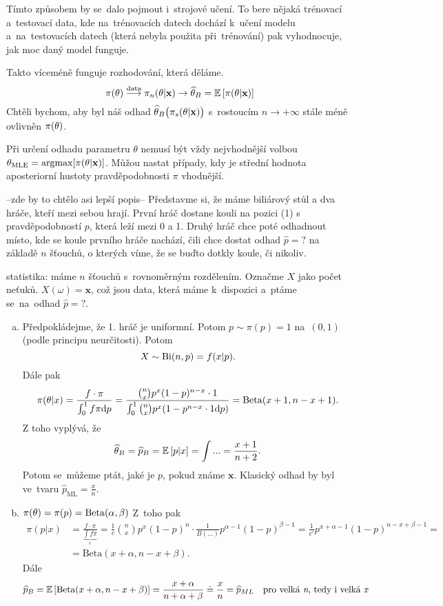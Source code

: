 

\begin{remark}
	Tímto způsobem by se~dalo pojmout i~strojové učení. To bere nějaká trénovací a~testovací data, kde na~trénovacích datech dochází k~učení modelu a~na~testovacích datech (která nebyla použita při~trénování) pak vyhodnocuje, jak moc daný model funguje.
\end{remark}
Takto víceméně funguje rozhodování, která děláme. 
$$ \pi(\theta)\stackrel{\text{data}}{\longrightarrow}\pi_n(\theta|\textbf{x})\to \widehat{\theta}_B=\mathbb{E}\left[ \pi(\theta|\textbf{x}) \right]$$
Chtěli bychom, aby byl náš odhad $\widehat{\theta}_B\big( \pi_s(\theta|\textbf{x}) \big)$ s~rostoucím $n\to+\infty$ stále méně ovlivněn $\pi(\theta)$.
\begin{remark}
Při určení odhadu parametru $ \theta $ nemusí být vždy nejvhodnější volbou $ \theta_{\text{MLE}} = \text{argmax}[\pi(\theta|\textbf{x})]$. Můžou nastat případy, kdy je střední hodnota aposteriorní hustoty pravděpodobnosti $ \pi $ vhodnější.

\end{remark}


\begin{example} --zde by to chtělo asi lepší popis--
	Představme si, že máme biliárový stůl a dva hráče, kteří mezi sebou hrají. První hráč dostane kouli na pozici (1) s pravděpodobností $p$, která leží mezi 0 a 1. Druhý hráč chce poté odhadnout místo, kde se koule prvního hráče nachází, čili chce dostat odhad $\widehat{p}=?$ na základě $n$ šťouchů, o kterých víme, že se buďto dotkly koule, či nikoliv. 
	
	statistika: máme $n$ šťouchů s~rovnoměrným rozdělením. Označme $X$ jako počet neťuků. $X(\omega)=\textbf{x}$, což jsou data, která máme k~dispozici a~ptáme se~na~odhad $\widehat{p}=?$.
	
	
	
	\begin{enumerate}[a)]
		\item Předpokládejme, že 1. hráč je uniformní. Potom $p\sim\pi(p)=1$ na~$(0,1)$ (podle principu neurčitosti). Potom
		$$ X\sim\mathrm{Bi}(n,p)=f(x|p).$$
		Dále pak 
		$$ \pi(\theta|x)=\frac{f\cdot\pi}{\int_0^1 f\pi\mathrm{d} p}=\frac{\binom{n}{x}p^x(1-p)^{n-x}\cdot 1}{\int_0^1 \binom{n}{x}p^x(1-p^{n-x}\cdot1 \mathrm{d} p)}=\mathrm{Beta}(x+1,n-x+1).$$
		Z toho vyplývá, že
		$$ \widehat{\theta}_B=\widehat{p}_B=\mathbb{E}\left[ p|x \right]=\int...=\frac{x+1}{n+2}.$$
		Potom se~můžeme ptát, jaké je $p$, pokud známe $\textbf{x}$. Klasický odhad by byl ve~tvaru $\widehat{p}_{\mathrm{ML}}=\frac{x}{n}$.
		\item $\pi(\theta)=\pi(p)=\mathrm{Beta}(\alpha,\beta)$ Z~toho pak 
		\[
		\begin{split}
		\pi(p|x)&=\frac{f\cdot\pi}{\underbrace{\int f\pi}_c}=\frac{1}{c}\binom{n}{x}p^x(1-p)^n\cdot \frac{1}{B(...)}p^{\alpha-1}(1-p)^{\beta-1}=\frac{1}{c'}p^{x+\alpha-1}(1-p)^{n-x+\beta-1}=\\&=\mathrm{Beta}(x+\alpha,n-x+\beta).
		\end{split}
		\] 
		Dále
		$$ \widehat{p}_B=\mathbb{E}\left[ \mathrm{Beta}(x+\alpha,n-x+\beta) \right]=\frac{x+\alpha}{n+\alpha+\beta}\doteq\frac{x}{n} = \widehat{p}_{ML} ~~~\text{pro velká \textit{n}, tedy i velká \textit{x}}$$
	\end{enumerate}
\end{example}

